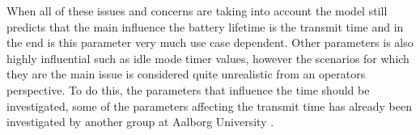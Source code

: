 When all of these issues and concerns are taking into account the model still predicts that the main influence the battery lifetime is the transmit time and in the end is this parameter  very much use case dependent. Other parameters is also highly influential such as idle mode timer values, however the scenarios for which they are the main issue is considered quite unrealistic from an operators perspective. To do this, the parameters that influence the time should be investigated, some of the parameters affecting the transmit time has already been investigated by another group at Aalborg University \citep{NDS_report}.



